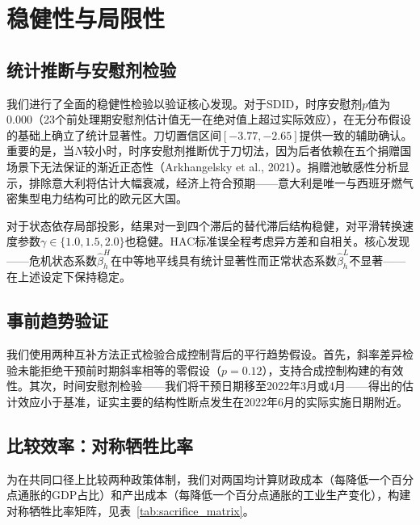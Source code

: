 \documentclass[12pt, a4paper]{article}
\begin{document}

\section{稳健性与局限性}

\subsection{统计推断与安慰剂检验}

我们进行了全面的稳健性检验以验证核心发现。对于SDID，时序安慰剂$p$值为0.000（23个前处理期安慰剂估计值无一在绝对值上超过实际效应），在无分布假设的基础上确立了统计显著性。刀切置信区间$[-3.77, -2.65]$提供一致的辅助确认。重要的是，当$N$较小时，时序安慰剂推断优于刀切法，因为后者依赖在五个捐赠国场景下无法保证的渐近正态性（Arkhangelsky et al., 2021）。捐赠池敏感性分析显示，排除意大利将估计大幅衰减，经济上符合预期——意大利是唯一与西班牙燃气密集型电力结构可比的欧元区大国。

对于状态依存局部投影，结果对一到四个滞后的替代滞后结构稳健，对平滑转换速度参数$\gamma \in \{1.0, 1.5, 2.0\}$也稳健。HAC标准误全程考虑异方差和自相关。核心发现——危机状态系数$\hat{\beta}^{H}_h$在中等地平线具有统计显著性而正常状态系数$\hat{\beta}^{L}_h$不显著——在上述设定下保持稳定。


\subsection{事前趋势验证}

我们使用两种互补方法正式检验合成控制背后的平行趋势假设。首先，斜率差异检验未能拒绝干预前时期斜率相等的零假设（$p=0.12$），支持合成控制构建的有效性。其次，时间安慰剂检验——我们将干预日期移至2022年3月或4月——得出的估计效应小于基准，证实主要的结构性断点发生在2022年6月的实际实施日期附近。


\subsection{比较效率：对称牺牲比率}

为在共同口径上比较两种政策体制，我们对两国均计算财政成本（每降低一个百分点通胀的GDP占比）和产出成本（每降低一个百分点通胀的工业生产变化），构建对称牺牲比率矩阵，见表~\ref{tab:sacrifice_matrix}。
\end{document}
